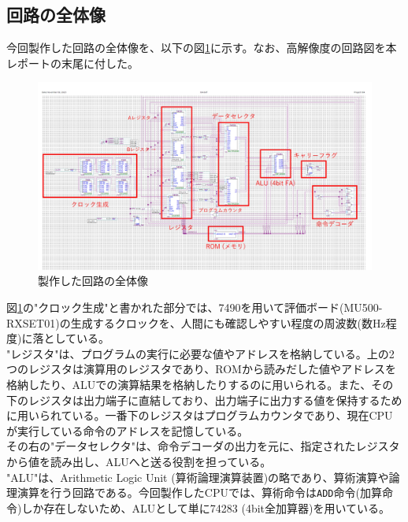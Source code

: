 \documentclass[dvipdfmx,a4j, titlepage]{jsarticle}
\begin{document}
\subsection{回路の全体像}
今回製作した回路の全体像を、以下の図\ref{circuit_diagram}に示す。なお、高解像度の回路図を本レポートの末尾に付した。

\begin{figure}[H]
    \begin{center}
        \includegraphics[width=165mm]{img/circuit_diagram.jpg}
    \end{center}
    \caption{製作した回路の全体像}
    \label{circuit_diagram}
\end{figure}

図\ref{circuit_diagram}の"クロック生成"と書かれた部分では、7490を用いて評価ボード(MU500-RXSET01)の生成するクロックを、人間にも確認しやすい程度の周波数(数Hz程度)に落としている。\\

"レジスタ"は、プログラムの実行に必要な値やアドレスを格納している。上の2つのレジスタは演算用のレジスタであり、ROMから読みだした値やアドレスを格納したり、ALUでの演算結果を格納したりするのに用いられる。また、その下のレジスタは出力端子に直結しており、出力端子に出力する値を保持するために用いられている。一番下のレジスタはプログラムカウンタであり、現在CPUが実行している命令のアドレスを記憶している。\\

その右の"データセレクタ"は、命令デコーダの出力を元に、指定されたレジスタから値を読み出し、ALUへと送る役割を担っている。\\

"ALU"は、Arithmetic Logic Unit (算術論理演算装置)の略であり、算術演算や論理演算を行う回路である。今回製作したCPUでは、算術命令は\verb|ADD|命令(加算命令)しか存在しないため、ALUとして単に74283 (4bit全加算器)を用いている。\\
\end{document}

